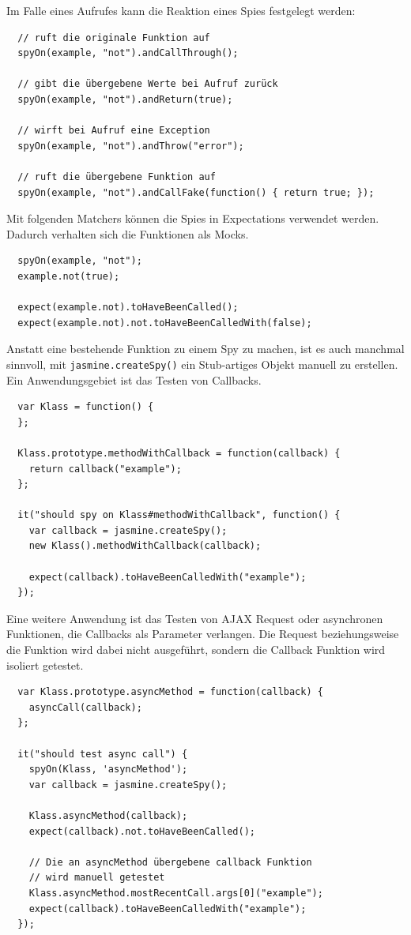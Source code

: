 \documentclass[11pt, a4paper]{article}
\begin{document}
Im Falle eines Aufrufes kann die Reaktion eines Spies festgelegt werden:

\begin{verbatim}
  // ruft die originale Funktion auf
  spyOn(example, "not").andCallThrough();

  // gibt die übergebene Werte bei Aufruf zurück
  spyOn(example, "not").andReturn(true);

  // wirft bei Aufruf eine Exception
  spyOn(example, "not").andThrow("error");

  // ruft die übergebene Funktion auf
  spyOn(example, "not").andCallFake(function() { return true; });
\end{verbatim}

Mit folgenden Matchers können die Spies in Expectations verwendet werden.
Dadurch verhalten sich die Funktionen als Mocks.

\begin{verbatim}
  spyOn(example, "not");
  example.not(true);

  expect(example.not).toHaveBeenCalled();
  expect(example.not).not.toHaveBeenCalledWith(false);
\end{verbatim}

Anstatt eine bestehende Funktion zu einem Spy zu machen, ist es auch manchmal
sinnvoll, mit \texttt{jasmine.createSpy()} ein Stub-artiges Objekt manuell zu erstellen.
Ein Anwendungsgebiet ist das Testen von Callbacks\cite{jasmine_jasmine_2011-1}.

\begin{verbatim}
  var Klass = function() {
  };

  Klass.prototype.methodWithCallback = function(callback) {
    return callback("example");
  };

  it("should spy on Klass#methodWithCallback", function() {
    var callback = jasmine.createSpy();
    new Klass().methodWithCallback(callback);

    expect(callback).toHaveBeenCalledWith("example");
  });
\end{verbatim}

Eine weitere Anwendung ist das Testen von AJAX Request oder asynchronen
Funktionen, die Callbacks als Parameter verlangen. Die Request beziehungsweise
die Funktion wird dabei nicht ausgeführt, sondern die Callback Funktion wird
isoliert getestet.

\begin{verbatim}
  var Klass.prototype.asyncMethod = function(callback) {
    asyncCall(callback);
  };

  it("should test async call") {
    spyOn(Klass, 'asyncMethod');
    var callback = jasmine.createSpy();

    Klass.asyncMethod(callback);
    expect(callback).not.toHaveBeenCalled();

    // Die an asyncMethod übergebene callback Funktion
    // wird manuell getestet
    Klass.asyncMethod.mostRecentCall.args[0]("example");
    expect(callback).toHaveBeenCalledWith("example");
  });
\end{verbatim}
\end{document}
